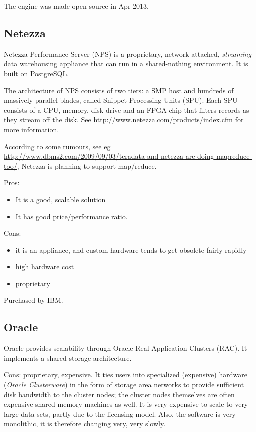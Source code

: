 \documentclass[DM,lsstdraft,toc]{lsstdoc}
\begin{document}
The engine was made open source in Apr 2013.

\subsection{Netezza}\label{netezza}

Netezza Performance Server (NPS) is a proprietary, network attached,
\emph{streaming} data warehousing appliance that can run in a
shared-nothing environment. It is built on PostgreSQL.

The architecture of NPS consists of two tiers: a SMP host and hundreds
of massively parallel blades, called Snippet Processing Units (SPU).
Each SPU consists of a CPU, memory, disk drive and an FPGA chip that
filters records as they stream off the disk. See
\url{http://www.netezza.com/products/index.cfm} for more information.

According to some rumours, see eg
\url{http://www.dbms2.com/2009/09/03/teradata-and-netezza-are-doing-mapreduce-too/},
Netezza is planning to support map/reduce.

Pros:

\begin{itemize}
\item
  It is a good, scalable solution
\item
  It has good price/performance ratio.
\end{itemize}

Cons:

\begin{itemize}
\item
  it is an appliance, and custom hardware tends to get obsolete fairly
  rapidly
\item
  high hardware cost
\item
  proprietary
\end{itemize}

Purchased by IBM.

\subsection{Oracle}\label{oracle}

Oracle provides scalability through Oracle Real Application Clusters
(RAC). It implements a shared-storage architecture.

Cons: proprietary, expensive. It ties users into specialized (expensive)
hardware (\emph{Oracle Clusterware}) in the form of storage area
networks to provide sufficient disk bandwidth to the cluster nodes; the
cluster nodes themselves are often expensive shared-memory machines as
well. It is very expensive to scale to very large data sets, partly due
to the licensing model. Also, the software is very monolithic, it is
therefore changing very, very slowly.
\end{document}
